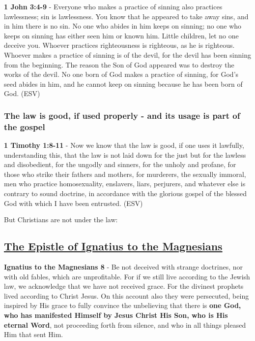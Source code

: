 \documentclass[11pt]{article}
\begin{document}
\textbf{1 John 3:4-9} -  Everyone who makes a practice of sinning also practices lawlessness; sin is lawlessness.  You know that he appeared to take away sins, and in him there is no sin.  No one who abides in him keeps on sinning; no one who keeps on sinning has either seen him or known him.  Little children, let no one deceive you.  Whoever practices righteousness is righteous, as he is righteous.  Whoever makes a practice of sinning is of the devil, for the devil has been sinning from the beginning.  The reason the Son of God appeared was to destroy the works of the devil.  No one born of God makes a practice of sinning, for God's seed abides in him, and he cannot keep on sinning because he has been born of God.  (ESV)

\subsubsection{The law is good, if used properly - and its usage is part of the gospel}
\label{sec:org5118cf4}
\textbf{1 Timothy 1:8-11} - Now we know that the law is good, if one uses it lawfully, understanding this, that the law is not laid down for the just but for the lawless and disobedient, for the ungodly and sinners, for the unholy and profane, for those who strike their fathers and mothers, for murderers, the sexually immoral, men who practice homosexuality, enslavers, liars, perjurers, and whatever else is contrary to sound doctrine, in accordance with the glorious gospel of the blessed God with which I have been entrusted. (ESV)

But Christians are not under the law:
\subsection{\href{http://persweb.wabash.edu/facstaff/royaltyr/AncientCities/web/bradleyj/Project\%201/The\%20Epistle\%20of\%20Ignatius\%20to\%20the\%20Magnesians.htm}{The Epistle of Ignatius to the Magnesians}}
\label{sec:org783547b}

\textbf{Ignatius to the Magnesians 8} - Be not deceived with strange doctrines, nor with old fables, which are unprofitable. For if we still live according to the Jewish law, we acknowledge that we have not received grace. For the divinest prophets lived according to Christ Jesus. On this account also they were persecuted, being inspired by His grace to fully convince the unbelieving that there is \textbf{one God, who has manifested Himself by Jesus Christ His Son, who is His eternal Word}, not proceeding forth from silence, and who in all things pleased Him that sent Him.
\end{document}

